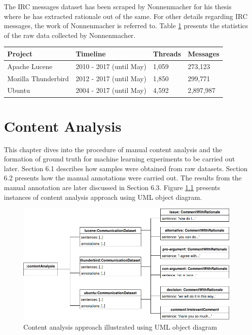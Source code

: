 \documentclass[a4paper,12pt,twoside]{report}
\begin{document}
The \acs{IRC} messages dataset has been scraped by Nonnenmacher \cite{Nonnenmacher2017} for his thesis where he has extracted rationale out of the same. For other details regarding \acs{IRC} messages, the work of Nonnenmacher \cite{Nonnenmacher2017} is referred to. Table \ref{tab:rawIRCMessages} presents the statistics of the raw data collected by Nonnenmacher. 
\noindent \newline
\begin{table}[H] %
    \centering
    \begin{adjustbox}{max width=\columnwidth}
    \def\arraystretch{1} %
    \begin{tabular}{p{4cm} p{5cm} p{2cm} p{3cm}}
        \toprule
        \textbf{Project} & \textbf{Timeline} & \textbf{Threads} & \textbf{Messages}\\
        \midrule
			Apache Lucene & 2010 - 2017 (until May) & 1,059 & 273,123\\
			Mozilla Thunderbird & 2012 - 2017 (until May) & 1,850 & 299,771\\ 
			Ubuntu & 2004 - 2017 (until May) & 4,592 & 2,897,987\\
        \midrule
    \end{tabular}
    \end{adjustbox}
    \label{tab:rawIRCMessages}
\end{table}


\chapter{Content Analysis}

This chapter dives into the procedure of manual content analysis and the formation of ground truth for machine learning experiments to be carried out later. Section 6.1 describes how samples were obtained from raw datasets. Section 6.2 presents how the manual annotations were carried out. The results from the manual annotation are later discussed in Section 6.3. Figure  \ref{fig:contentObject} presents instances of content analysis approach using UML object diagram. 
\begin{figure}[h] %
    \centering
    \includegraphics[width=13cm]{content-analysis-object-diagram}
    \caption{Content analysis approach illustrated using UML object diagram}
    \label{fig:contentObject}
\end{figure}
\end{document}
